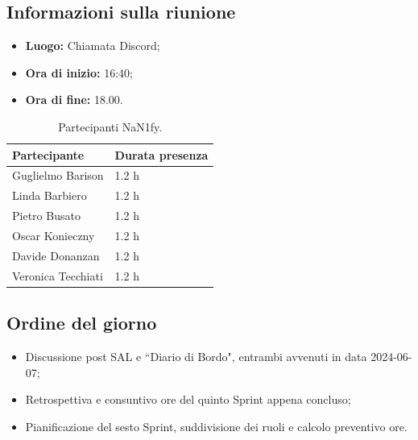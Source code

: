 \documentclass[8pt]{article}
\begin{document}
\subsection{Informazioni sulla riunione}
\begin{itemize}
	\setlength\itemsep{0em}
	\item\textbf{Luogo:} Chiamata Discord;
	\item\textbf{Ora di inizio:} 16:40;
	\item\textbf{Ora di fine:}  18.00.
\end{itemize}
\begin{table}[ht!]
	\begin{minipage}[t]{0.5\linewidth}
		\centering
		\begin{tabular}{p{3cm} p{3cm}}
			\toprule
			\textbf{Partecipante} & \textbf{Durata presenza} \\
			\midrule
			Guglielmo Barison & 1.2 h \\
			Linda Barbiero &  1.2 h \\
			Pietro Busato & 1.2 h \\
			Oscar Konieczny & 1.2 h \\
			Davide Donanzan & 1.2 h \\
			Veronica Tecchiati & 1.2 h \\
			\bottomrule
		\end{tabular}
		\caption{Partecipanti NaN1fy.}
		\label{table:Partecipanti NaN1fy}
	\end{minipage} 
\end{table}
\subsection{Ordine del giorno}
\begin{itemize}
	\setlength\itemsep{0em}
  \item Discussione post SAL e ``Diario di Bordo", entrambi avvenuti in data 2024-06-07;
    \item Retrospettiva e consuntivo ore del quinto Sprint appena concluso;
    \item Pianificazione del sesto Sprint, suddivisione dei ruoli e calcolo preventivo ore.
\end{itemize}
\end{document}
